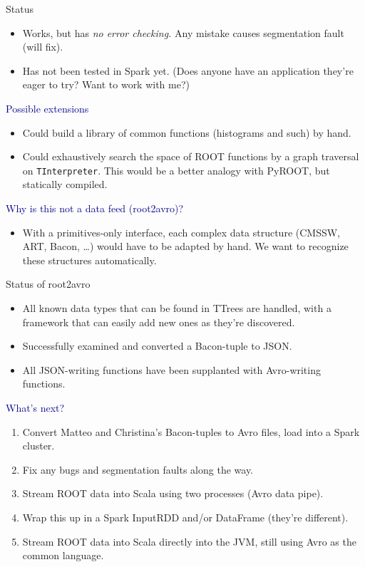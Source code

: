 \documentclass{beamer}
\begin{document}
\begin{frame}{Status}
\begin{itemize}
\item Works, but has {\it no error checking.} Any mistake causes segmentation fault (will fix).
\item Has not been tested in Spark yet. (Does anyone have an application they're eager to try? Want to work with me?)
\end{itemize}

\vfill
\vfill
\hspace{-0.83 cm} \textcolor{darkblue}{\Large Possible extensions}
\begin{itemize}
\item Could build a library of common functions (histograms and such) by hand.
\item Could exhaustively search the space of ROOT functions by a graph traversal on {\tt TInterpreter}. This would be a better analogy with PyROOT, but statically compiled.
\end{itemize}

\vfill
\vfill
\hspace{-0.83 cm} \textcolor{darkblue}{\Large Why is this not a data feed (root2avro)?}
\begin{itemize}
\item With a primitives-only interface, each complex data structure (CMSSW, ART, Bacon, \ldots) would have to be adapted by hand. We want to recognize these structures automatically.
\end{itemize}
\end{frame}

\begin{frame}{Status of root2avro}
\begin{itemize}
\item All known data types that can be found in TTrees are handled, with a framework that can easily add new ones as they're discovered.
\item Successfully examined and converted a Bacon-tuple to JSON.
\item All JSON-writing functions have been supplanted with Avro-writing functions.
\end{itemize}

\vfill
\vfill
\hspace{-0.83 cm} \textcolor{darkblue}{\Large What's next?}
\begin{enumerate}
\item Convert Matteo and Christina's Bacon-tuples to Avro files, load into a Spark cluster.
\item Fix any bugs and segmentation faults along the way.
\item Stream ROOT data into Scala using two processes (Avro data pipe).
\item Wrap this up in a Spark InputRDD and/or DataFrame (they're different).
\item Stream ROOT data into Scala directly into the JVM, still using Avro as the common language.
\end{enumerate}
\end{frame}
\end{document}
